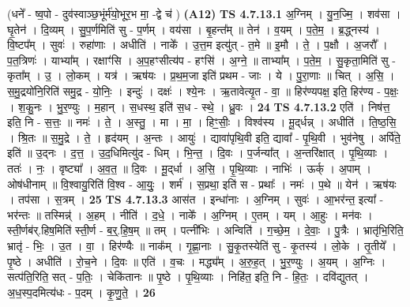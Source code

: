 \documentclass[17pt]{extarticle}
\begin{document}
                  \newline
                      (धने᳚ - ष्व॒पो - दुव॑स्वाञ्छ॒भूंर्म॑यो॒भूर॒भ मा॒ -द्वे च॑ )  \textbf{(A12)} \newline \newline
                                \textbf{ TS 4.7.13.1} \newline
                  अ॒ग्निम् । यु॒न॒ज्मि॒ । शव॑सा । घृ॒तेन॑ । दि॒व्यम् । सु॒प॒र्णमिति॑ सु - प॒र्णम् । वय॑सा । बृ॒हन्त᳚म् ॥ तेन॑ । व॒यम् । प॒ते॒म॒ । ब्र॒द्ध्नस्य॑ । वि॒ष्टप᳚म् । सुवः॑ । रुहा॑णाः । अधीति॑ । नाके᳚ । उ॒त्त॒म इत्यु॑त् - त॒मे ॥ इ॒मौ । ते॒ । प॒क्षौ । अ॒जरौ᳚ । प॒त॒त्रिणः॑ । याभ्या᳚म् । रक्षाꣳ॑सि । अ॒प॒हꣳसीत्य॑प - हꣳसि॑ । अ॒ग्ने॒ ॥ ताभ्या᳚म् । प॒ते॒म॒ । सु॒कृता॒मिति॑ सु - कृता᳚म् । उ॒ । लो॒कम् । यत्र॑ । ऋष॑यः । प्र॒थ॒म॒जा इति॑ प्रथम - जाः । ये । पु॒रा॒णाः ॥ चित् । अ॒सि॒ । स॒मु॒द्रयो॑नि॒रिति॑ समु॒द्र - यो॒निः॒ । इन्दुः॑ । दक्षः॑ । श्ये॒नः । ऋ॒तावेत्यृ॒त - वा॒ ॥ हिर॑ण्यपक्ष॒ इति॒ हिर॑ण्य - प॒क्षः॒ । श॒कु॒नः । भु॒र॒ण्युः । म॒हान् । स॒धस्थ॒ इति॑ स॒ध - स्थे॒ । ध्रु॒वः । \textbf{  24} \newline
                  \newline
                                \textbf{ TS 4.7.13.2} \newline
                  एति॑ । निष॑त्त॒ इति॒ नि - स॒त्तः॒ ॥ नमः॑ । ते॒ । अ॒स्तु॒ । मा । मा॒ । हिꣳ॒॒सीः॒ । विश्व॑स्य । मू॒द्‌र्धन्न् । अधीति॑ । ति॒ष्ठ॒सि॒ । श्रि॒तः ॥ स॒मु॒द्रे । ते॒ । हृद॑यम् । अ॒न्तः । आयुः॑ । द्यावा॑पृथि॒वी इति॒ द्यावा᳚ - पृ॒थि॒वी । भुव॑नेषु । अर्पि॑ते॒ इति॑ ॥ उ॒द्नः । द॒त्त॒ । उ॒द॒धिमित्यु॑द - धिम् । भि॒न्त॒ । दि॒वः । प॒र्जन्या᳚त् । अ॒न्तरि॑क्षात् । पृ॒थि॒व्याः । ततः॑ । नः॒ । वृष्ट्या᳚ । अ॒व॒त॒ ॥ दि॒वः । मू॒द्‌र्धा । अ॒सि॒ । पृ॒थि॒व्याः । नाभिः॑ । ऊर्क् । अ॒पाम् । ओष॑धीनाम् ॥ वि॒श्वायु॒रिति॑ वि॒श्व - आ॒युः॒ । शर्म॑ । स॒प्रथा॒ इति॑ स - प्रथाः᳚ । नमः॑ । प॒थे ॥ येन॑ । ऋष॑यः । तप॑सा । स॒त्रम् । \textbf{  25} \newline
                  \newline
                                \textbf{ TS 4.7.13.3} \newline
                  आस॑त । इन्धा॑नाः । अ॒ग्निम् । सुवः॑ । आ॒भर॑न्त॒ इत्या᳚ - भर॑न्तः ॥ तस्मिन्न्॑ । अ॒हम् । नीति॑ । द॒धे॒ । नाके᳚ । अ॒ग्निम् । ए॒तम् । यम् । आ॒हुः । मन॑वः । स्ती॒र्णब॑र्.हिष॒मिति॑ स्ती॒र्ण - ब॒र्॒.हि॒ष॒म् ॥ तम् । पत्नी॑भिः । अन्विति॑ । ग॒च्छे॒म॒ । दे॒वाः॒ । पु॒त्रैः । भ्रातृ॑भि॒रिति॒ भ्रातृ॑ - भिः॒ । उ॒त । वा॒ । हिर॑ण्यैः ॥ नाक᳚म् । गृ॒ह्णा॒नाः । सु॒कृ॒तस्येति॑ सु - कृ॒तस्य॑ । लो॒के । तृ॒तीये᳚ । पृ॒ष्ठे । अधीति॑ । रो॒च॒ने । दि॒वः ॥ एति॑ । व॒चः । मद्ध्य᳚म् । अ॒रु॒ह॒त् । भु॒र॒ण्युः । अ॒यम् । अ॒ग्निः । सत्प॑ति॒रिति॒ सत् - प॒तिः॒ । चेकि॑तानः ॥ पृ॒ष्ठे । पृ॒थि॒व्याः । निहि॑त॒ इति॒ नि - हि॒तः॒ । दवि॑द्युतत् । अ॒ध॒स्प॒दमित्य॑धः - प॒दम् । कृ॒णु॒ते॒ । \textbf{  26} \newline
\end{document}
